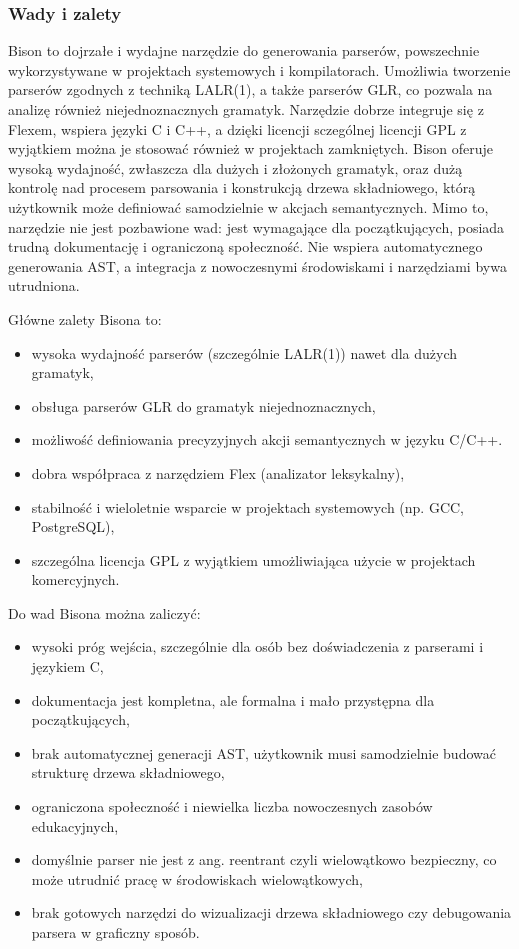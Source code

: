 \documentclass[12pt,twoside]{article}
\begin{document}
\subsubsection{ Wady i zalety}
Bison to dojrzałe i wydajne narzędzie do generowania parserów, powszechnie wykorzystywane w projektach systemowych i kompilatorach. Umożliwia tworzenie parserów zgodnych z techniką LALR(1), a także parserów GLR, co pozwala na analizę również niejednoznacznych gramatyk. Narzędzie dobrze integruje się z Flexem, wspiera języki C i C++, a dzięki licencji sczególnej licencji GPL z wyjątkiem można je stosować również w projektach zamkniętych. Bison oferuje wysoką wydajność, zwłaszcza dla dużych i złożonych gramatyk, oraz dużą kontrolę nad procesem parsowania i konstrukcją drzewa składniowego, którą użytkownik może definiować samodzielnie w akcjach semantycznych. Mimo to, narzędzie nie jest pozbawione wad: jest wymagające dla początkujących, posiada trudną dokumentację i ograniczoną społeczność. Nie wspiera automatycznego generowania AST, a integracja z nowoczesnymi środowiskami i narzędziami bywa utrudniona.

Główne zalety Bisona to:
\begin{itemize}[label=\textbullet, leftmargin=1.25cm]
\item wysoka wydajność parserów (szczególnie LALR(1)) nawet dla dużych gramatyk,
\item obsługa parserów GLR do gramatyk niejednoznacznych,
\item możliwość definiowania precyzyjnych akcji semantycznych w języku C/C++.
\item dobra współpraca z narzędziem Flex (analizator leksykalny),
\item stabilność i wieloletnie wsparcie w projektach systemowych (np. GCC, PostgreSQL),
\item szczególna licencja GPL z wyjątkiem umożliwiająca użycie w projektach komercyjnych.
\end{itemize}

Do wad Bisona można zaliczyć:
\begin{itemize}[label=\textbullet, leftmargin=1.25cm]
\item wysoki próg wejścia, szczególnie dla osób bez doświadczenia z parserami i językiem C,
\item dokumentacja jest kompletna, ale formalna i mało przystępna dla początkujących,
\item brak automatycznej generacji AST, użytkownik musi samodzielnie budować strukturę drzewa składniowego,
\item ograniczona społeczność i niewielka liczba nowoczesnych zasobów edukacyjnych,
\item domyślnie parser nie jest z ang. reentrant czyli wielowątkowo bezpieczny, co może utrudnić pracę w środowiskach wielowątkowych,
\item brak gotowych narzędzi do wizualizacji drzewa składniowego czy debugowania parsera w graficzny sposób.
\end{itemize}
\end{document}

